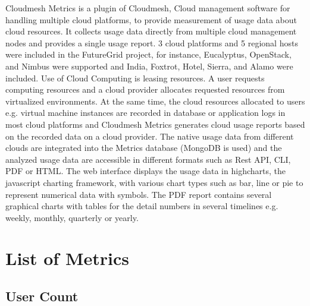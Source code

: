 \documentclass{sig-alternate-05-2015}
\begin{document}
Cloudmesh Metrics is a plugin of Cloudmesh, Cloud management software for handling multiple cloud platforms, to provide measurement of usage data about cloud resources. It collects usage data directly from multiple cloud management nodes and provides a single usage report. 3 cloud platforms and 5 regional hosts were included in the FutureGrid project, for instance, Eucalyptus, OpenStack, and Nimbus were supported and India, Foxtrot, Hotel, Sierra, and Alamo were included. Use of Cloud Computing is leasing resources. A user requests computing resources and a cloud provider allocates requested resources from virtualized environments. At the same time, the cloud resources allocated to users e.g. virtual machine instances are recorded in database or application logs in most cloud platforms and Cloudmesh Metrics generates cloud usage reports based on the recorded data on a cloud provider. The native usage data from different clouds are integrated into the Metrics database (MongoDB is used) and the analyzed usage data are accessible in different formats such as Rest API, CLI, PDF or HTML. The web interface displays the usage data in highcharts, the javascript charting framework, with various chart types such as bar, line or pie to represent numerical data with symbols. The PDF report contains several graphical charts with tables for the detail numbers in several timelines e.g. weekly, monthly, quarterly or yearly. 


\section{List of Metrics}
\subsection{User Count}
\end{document}
